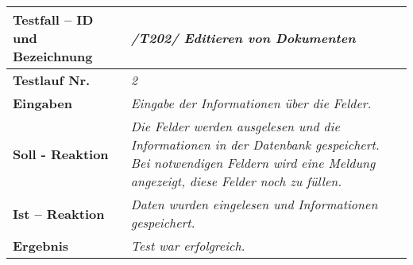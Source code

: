 \begin{longtable}{|p{5cm}|p{10cm}|}
\hline
\textbf{Testfall -- ID und Bezeichnung} & \textit{/T202/ Editieren von
Dokumenten} \\
\hline
\textbf{Testlauf Nr.} & \textit{2} \\
\hline
\textbf{Eingaben} & \textit{
Eingabe der Informationen über die Felder.} \\
\hline
\textbf{Soll - Reaktion} & \textit{
Die Felder werden ausgelesen und die Informationen in der Datenbank gespeichert.
Bei notwendigen Feldern wird eine Meldung angezeigt, diese Felder noch zu
füllen.
} \\
\hline
\textbf{Ist -- Reaktion} & \textit{Daten wurden eingelesen und Informationen 
gespeichert.} \\
\hline
\textbf{Ergebnis} & \textit{Test war erfolgreich.} \\
\end{longtable}

